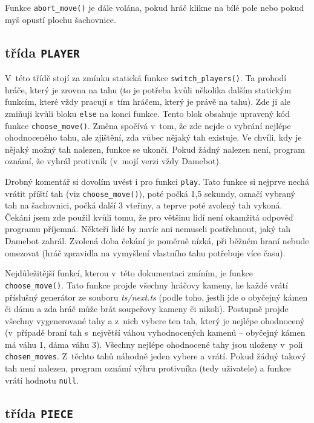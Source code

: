 \documentclass[a4paper,12pt]{article}
\begin{document}
	Funkce \verb|abort_move()| je dále volána, pokud hráč klikne na bílé pole nebo pokud myš opustí plochu šachovnice.
	
	\subsection{třída \texttt{PLAYER}}
	V~této třídě stojí za zmínku statická funkce \verb|switch_players()|. Ta prohodí hráče, který je zrovna na tahu (to je potřeba kvůli
	několika dalším statickým funkcím, které vždy pracují s~tím hráčem, který je právě na tahu). Zde ji ale zmiňuji kvůli bloku \texttt{else} na konci
	funkce. Tento blok obsahuje upravený kód funkce \verb|choose_move()|. Změna spočívá v~tom, že zde nejde o vybrání nejlépe ohodnoceného tahu,
	ale zjištění, zda vůbec nějaký tah existuje. Ve chvíli, kdy je nějaký možný tah nalezen, funkce se ukončí. Pokud žádný nalezen není,
	program oznámí, že vyhrál protivník (v~mojí verzi vždy Damebot).
	
	Drobný komentář si dovolím uvést i pro funkci \verb|play|. Tato funkce si nejprve nechá vrátit příští tah (viz \verb|choose_move()|),
	poté počká 1,5 sekundy, označí vybraný tah na šachovnici, počká další 3 vteřiny, a teprve poté zvolený tah vykoná. Čekání jsem zde
	použil kvůli tomu, že pro většinu lidí není okamžitá odpověď programu příjemná. Někteří lidé by navíc ani nemuseli postřehnout,
	jaký tah Damebot zahrál. Zvolená doba čekání je poměrně nízká, při běžném hraní nebude omezovat (hráč zpravidla na vymyšlení
	vlastního tahu potřebuje více času).
	
	Nejdůležitější funkcí, kterou v~této dokumentaci zmíním, je funkce \verb|choose_move()|. Tato funkce projde všechny hráčovy kameny,
	ke každé vrátí příslušný generátor ze souboru \textit{ts/next.ts} (podle toho, jestli jde o obyčejný kámen či dámu a zda hráč může
	brát soupeřovy kameny či nikoli). Postupně projde všechny vygenerované tahy a z~nich vybere ten tah, který je nejlépe ohodnocený
	(v~případě braní tah s~největší váhou vyhodnocených kamenů -- obyčejný kámen má váhu 1, dáma váhu 3). Všechny nejlépe ohodnocené
	tahy jsou uloženy v~poli \texttt{chosen\_moves}. Z~těchto tahů náhodně jeden vybere a vrátí. Pokud žádný takový tah není nalezen,
	program oznámí výhru protivníka (tedy uživatele) a funkce vrátí hodnotu \texttt{null}.
	
	\subsection{třída \texttt{PIECE}}
\end{document}
